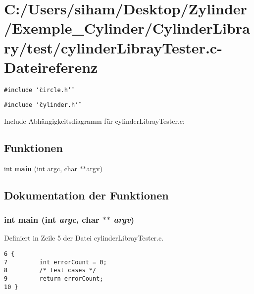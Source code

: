 \section{C:/Users/siham/Desktop/Zylinder/Exemple\_\-Cylinder/Cylinder\-Library/test/cylinder\-Libray\-Tester.c-Dateireferenz}
\label{cylinder_libray_tester_8c}
{\tt \#include \char`\"{}circle.h\char`\"{}}\par
{\tt \#include \char`\"{}cylinder.h\char`\"{}}\par


Include-Abh\"{a}ngigkeitsdiagramm f\"{u}r cylinder\-Libray\-Tester.c:\subsection*{Funktionen}
\begin{CompactItemize}
\item 
int {\bf main} (int argc, char $\ast$$\ast$argv)
\end{CompactItemize}


\subsection{Dokumentation der Funktionen}
\subsubsection{\setlength{\rightskip}{0pt plus 5cm}int main (int {\em argc}, char $\ast$$\ast$ {\em argv})}\label{cylinder_libray_tester_8c_30c4c19ff69d905e8e4c750b3af23485}




Definiert in Zeile 5 der Datei cylinder\-Libray\-Tester.c.

\footnotesize\begin{verbatim}6 {
7         int errorCount = 0;
8         /* test cases */
9         return errorCount;
10 }
\end{verbatim}\normalsize 


